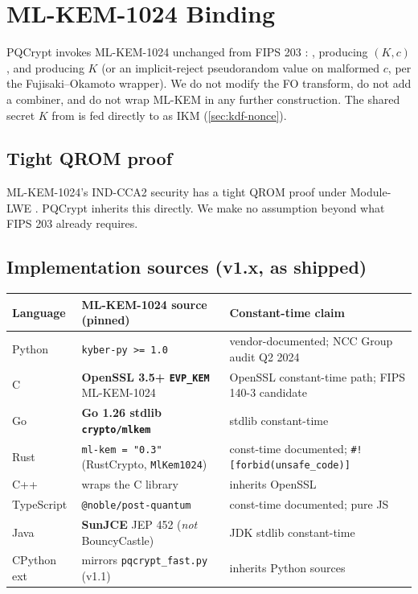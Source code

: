 \section{ML-KEM-1024 Binding}
\label{sec:mlkem}

PQCrypt invokes ML-KEM-1024 unchanged from FIPS 203 \citep{fips203}: ,  producing $(K, c)$, and  producing $K$ (or an implicit-reject pseudorandom value on malformed $c$, per the Fujisaki--Okamoto wrapper). We do not modify the FO transform, do not add a combiner, and do not wrap ML-KEM in any further construction. The shared secret $K$ from  is fed directly to  as IKM (\cref{sec:kdf-nonce}).

\subsection{Tight QROM proof}

ML-KEM-1024's IND-CCA2 security has a tight QROM proof under Module-LWE \citep{hofheinz2017fo,don2022qrom}. PQCrypt inherits this directly. We make no assumption beyond what FIPS 203 already requires.

\subsection{Implementation sources (v1.x, as shipped)}

\begin{center}
\small
\begin{tabular}{@{}lll@{}}
\toprule
\textbf{Language} & \textbf{ML-KEM-1024 source (pinned)} & \textbf{Constant-time claim} \\
\midrule
Python      & \texttt{kyber-py >= 1.0}                                & vendor-documented; NCC Group audit Q2 2024 \\
C           & \textbf{OpenSSL 3.5+ \texttt{EVP\_KEM}} ML-KEM-1024      & OpenSSL constant-time path; FIPS 140-3 candidate \\
Go          & \textbf{Go 1.26 stdlib \texttt{crypto/mlkem}}           & stdlib constant-time \\
Rust        & \texttt{ml-kem = "0.3"} (RustCrypto, \texttt{MlKem1024}) & const-time documented; \texttt{\#![forbid(unsafe\_code)]} \\
C++         & wraps the C library                                     & inherits OpenSSL \\
TypeScript  & \texttt{@noble/post-quantum}                            & const-time documented; pure JS \\
Java        & \textbf{SunJCE} JEP 452 (\emph{not} BouncyCastle)        & JDK stdlib constant-time \\
CPython ext & mirrors \texttt{pqcrypt\_fast.py} (v1.1)                 & inherits Python sources \\
\bottomrule
\end{tabular}
\end{center}

